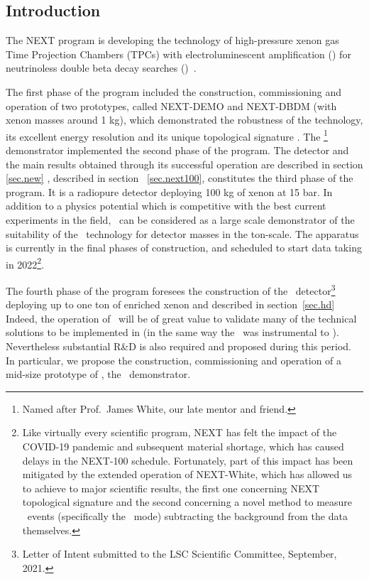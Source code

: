 \subsection{Introduction}

The NEXT program is developing the technology of high-pressure xenon gas Time Projection Chambers (TPCs) with electroluminescent amplification (\HPXeEL) for neutrinoless double beta decay searches (\bbonu)~\cite{Gomez-Cadenas:2019sfa}. 

\indent

The first phase of the program included the construction, commissioning and operation of two prototypes, called NEXT-DEMO and NEXT-DBDM (with xenon masses around 1 kg), which demonstrated the robustness of the technology, its excellent energy resolution and its unique topological signature \cite{Alvarez:2012xda, Alvarez:2013gxa, Alvarez:2012hh, Ferrario:2015kta}. The \NEW\footnote{Named after Prof.~James White, our late mentor and friend.} demonstrator implemented the second phase of the program. The detector and the main results obtained through its successful operation are described in section \ref{sec.new} \Next, described in section ~\ref{sec.next100}, constitutes the third phase of the program. It is a radiopure detector deploying 100 kg of xenon at 15 bar. In addition to a physics potential which is competitive with the best current experiments in the field, \Next\ can be considered as a large scale demonstrator of the suitability of the \HPXeEL\ technology for detector masses in the ton-scale. The apparatus is currently in the final phases of construction, and scheduled to start data taking in 2022\footnote{
Like virtually every scientific program, NEXT has felt the impact of the COVID-19 pandemic and subsequent material shortage, which has caused delays in the NEXT-100 schedule. Fortunately, part of this impact has been mitigated by the extended operation of NEXT-White, which has allowed us to achieve to major scientific results, the first one concerning NEXT topological signature and the second concerning a novel method to measure \bb\ events
(specifically the \bbtnu\ mode) subtracting the background from the data themselves.}. 

\indent

The fourth phase of the program foresees the construction of the \NHD\ detector\footnote{Letter of Intent submitted to the LSC Scientific Committee, September,  2021.} deploying up to one ton of enriched xenon and described in section~\ref{sec.hd} Indeed, the operation of \Next\ will be of great value to validate many of the technical solutions to be implemented in \NHD (in the same way the \NEW\ was instrumental to \Next). Nevertheless substantial R\&D is also required and proposed during this period. In particular, we propose the construction, commissioning and operation of a mid-size prototype of \NHD, the \HDEMO\ demonstrator. 

